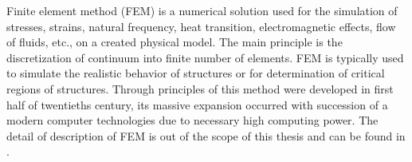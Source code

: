 Finite element method (FEM) is a numerical solution used for the simulation of stresses, strains, natural frequency, heat transition, electromagnetic effects, flow of fluids, etc., on a created physical model. The main principle is the discretization of continuum into finite number of elements. FEM is typically used to simulate the realistic behavior of structures or for determination of critical regions of structures. Through principles of this method were developed in first half of twentieths century, its massive expansion occurred with succession of a modern computer technologies due to necessary high computing power. The detail of description of FEM is out of the scope of this thesis and can be found in \cite{dhatt2012finite}. 

